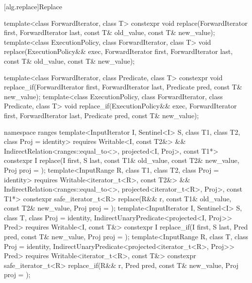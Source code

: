 [alg.replace]{Replace}

%
%
\begin{itemdecl}
template<class ForwardIterator, class T>
  constexpr void replace(ForwardIterator first, ForwardIterator last,
                         const T& old_value, const T& new_value);
template<class ExecutionPolicy, class ForwardIterator, class T>
  void replace(ExecutionPolicy&& exec,
               ForwardIterator first, ForwardIterator last,
               const T& old_value, const T& new_value);

template<class ForwardIterator, class Predicate, class T>
  constexpr void replace_if(ForwardIterator first, ForwardIterator last,
                            Predicate pred, const T& new_value);
template<class ExecutionPolicy, class ForwardIterator, class Predicate, class T>
  void replace_if(ExecutionPolicy&& exec,
                  ForwardIterator first, ForwardIterator last,
                  Predicate pred, const T& new_value);

namespace ranges {
  template<InputIterator I, Sentinel<I> S, class T1, class T2, class Proj = identity>
    requires Writable<I, const T2&> &&
      IndirectRelation<ranges::equal_to<>, projected<I, Proj>, const T1*>
    constexpr I
      replace(I first, S last, const T1& old_value, const T2& new_value, Proj proj = {});
  template<InputRange R, class T1, class T2, class Proj = identity>
    requires Writable<iterator_t<R>, const T2&> &&
      IndirectRelation<ranges::equal_to<>, projected<iterator_t<R>, Proj>, const T1*>
    constexpr safe_iterator_t<R>
      replace(R&& r, const T1& old_value, const T2& new_value, Proj proj = {});
  template<InputIterator I, Sentinel<I> S, class T, class Proj = identity,
      IndirectUnaryPredicate<projected<I, Proj>> Pred>
    requires Writable<I, const T&>
    constexpr I replace_if(I first, S last, Pred pred, const T& new_value, Proj proj = {});
  template<InputRange R, class T, class Proj = identity,
      IndirectUnaryPredicate<projected<iterator_t<R>, Proj>> Pred>
    requires Writable<iterator_t<R>, const T&>
    constexpr safe_iterator_t<R>
      replace_if(R&& r, Pred pred, const T& new_value, Proj proj = {});
}
\end{itemdecl}

